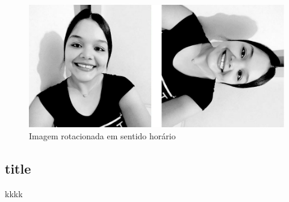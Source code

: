 			\begin{figure}[!htb]
					\centering
					\includegraphics[width=\textwidth]{img/04-rotacao-2.jpg}
					\caption{Imagem rotacionada em sentido horário}
			\end{figure}
	
			\lstset{language=Python}
			{\tiny }
			
	\subsection{title}
		kkkk